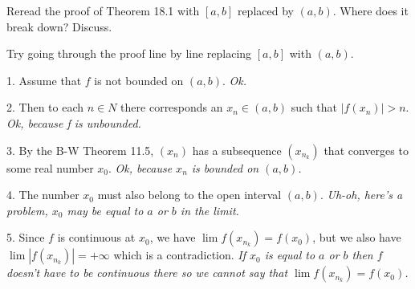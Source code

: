 
Reread the proof of Theorem 18.1 with $[a,b]$ replaced by $(a,b)$.
Where does it break down? Discuss.

\medskip

Try going through the proof line by line replacing $[a,b]$ with $(a,b)$.

1. Assume that $f$ is not bounded on $(a,b)$. {\it Ok.}

2. Then to each $n\in N$ there corresponds an $x_n\in (a,b)$ such that
$|f(x_n)|>n$. {\it Ok, because f is unbounded.}

3. By the B-W Theorem 11.5, $(x_n)$ has a subsequence $(x_{n_k})$ that converges
to some real number $x_0$.
{\it Ok, because $x_n$ is bounded on $(a,b)$.}

4. The number $x_0$ must also belong to the open interval $(a,b)$.
{\it Uh-oh, here's a problem, $x_0$ may be equal to $a$ or $b$ in the limit.}

5. Since $f$ is continuous at $x_0$, we have $\lim f(x_{n_k})=f(x_0)$,
but we also have $\lim|f(x_{n_k})|=+\infty$ which is a contradiction.
{\it If $x_0$ is equal to $a$ or $b$ then $f$ doesn't have to be continuous
there so we cannot say that $\lim f(x_{n_k})=f(x_0)$.}
